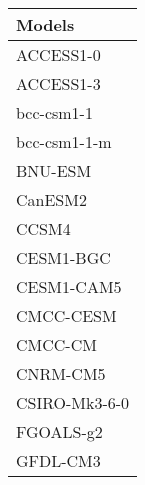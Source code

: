 \documentclass{ametsocV5}
\begin{document}

\begin{table}[t]
\begin{center}
  \renewcommand{\arraystretch}{1.0}
  \begin{tabular}{ l }
    Models          \\%
    \hline
    ACCESS1-0       \\%
    ACCESS1-3       \\%
    bcc-csm1-1      \\%
    bcc-csm1-1-m    \\%
    BNU-ESM         \\%
    CanESM2         \\%
    CCSM4           \\%
    CESM1-BGC       \\%
    CESM1-CAM5      \\%
    CMCC-CESM       \\%
    CMCC-CM         \\%
    CNRM-CM5        \\%
    CSIRO-Mk3-6-0   \\%
    FGOALS-g2       \\%
    GFDL-CM3        \\%

\end{tabular}
\end{center}
\end{table}
\end{document}

